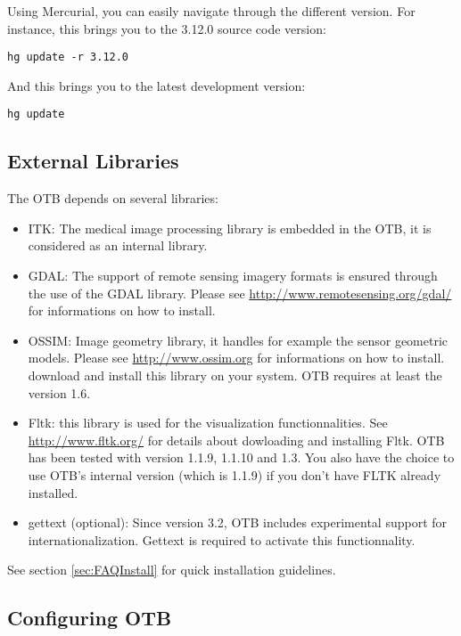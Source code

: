 Using Mercurial, you can easily navigate through the different version. For instance, this brings you to the 3.12.0 source code version:
\begin{verbatim}
hg update -r 3.12.0
\end{verbatim}

And this brings you to the latest development version:
\begin{verbatim}
hg update
\end{verbatim}


\subsection{External Libraries}

The OTB depends on several libraries:
\begin{itemize}
\item ITK: The medical image processing library is embedded in the OTB, it is considered as an internal library.
\item GDAL: The support of remote sensing imagery formats is ensured
  through the use of the GDAL library. Please see
  \url{http://www.remotesensing.org/gdal/} for informations on how to install.
\item OSSIM: Image geometry library, it handles for example the sensor geometric models. 
  Please see \url{http://www.ossim.org} for informations on how to install.
download and install this library on your system. OTB requires at least the version 1.6.
\item Fltk: this library is used for the visualization
  functionnalities. See \url{http://www.fltk.org/} for details about
  dowloading and installing Fltk. OTB has been tested with version 1.1.9,
  1.1.10 and 1.3. You also have the choice to use OTB's internal
  version (which is 1.1.9) if you don't have FLTK already installed.
\item gettext (optional): Since version 3.2, OTB includes experimental support 
  for internationalization. Gettext is required to activate this 
  functionnality.  
\end{itemize}

See section \ref{sec:FAQInstall} for quick installation guidelines.

\subsection{Configuring OTB}
\label{sec:ConfiguringOTB}


